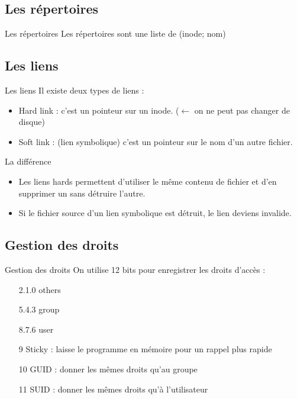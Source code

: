 \def\subsectitle{Les répertoires}
\subsection{\subsectitle}
\begin{frame}{\sectitle}
	\begin{block}{\subsectitle}
	Les répertoires sont une liste de (inode; nom)
	\end{block}

	\def\subsectitle{Les liens}
	\subsection{\subsectitle}
	\begin{block}{\subsectitle}
	Il existe deux types de liens :
		\begin{itemize}
		\item Hard link : c'est un pointeur sur un inode. ($\leftarrow$ on ne peut pas changer de disque)
		\item Soft link : (lien symbolique) c'est un pointeur sur le nom d'un autre fichier.
		\end{itemize}
	\end{block}

	\begin{block}{La différence}
		\begin{itemize}
		\item Les liens hards permettent d'utiliser le même contenu de fichier et d'en supprimer un sans détruire l'autre.
		\item Si le fichier source d'un lien symbolique est détruit, le lien deviens invalide.
		\end{itemize}	
	\end{block}
\end{frame}

\def\subsectitle{Gestion des droits}
\subsection{\subsectitle}
\begin{frame}{\sectitle}
	\begin{block}{\subsectitle}
	On utilise 12 bits pour enregistrer les droits d'accès :
		\begin{itemize}
		\item [2.1.0] others
		\item [5.4.3] group
		\item [8.7.6] user
		\item [9] Sticky : laisse le programme en mémoire pour un rappel plus rapide
		\item [10] GUID : donner les mêmes droits qu'au groupe
		\item [11] SUID : donner les mêmes droits qu'à l'utilisateur
		\end{itemize}
	\end{block}
\end{frame}

